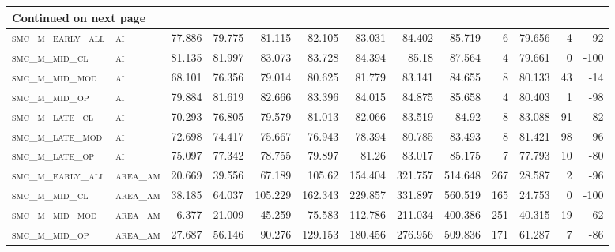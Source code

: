 \begin{landscape}
\begin{center}
\begin{footnotesize}
\begin{longtable}{llrrrrrrrr|rrr}
\hline \multicolumn{13}{|l|}{{Continued on next page}} \\ \hline
\endfoot

\hline \hline
\endlastfoot

\textsc{smc\_m\_early\_all} & \textsc{ai        }   & 77.886   & 79.775   & 81.115   & 82.105   & 83.031   & 84.402   & 85.719   & 6      & 79.656        & 4             & -92             \\
\textsc{smc\_m\_mid\_cl   } & \textsc{ai        }   & 81.135   & 81.997   & 83.073   & 83.728   & 84.394   & 85.18    & 87.564   & 4      & 79.661        & 0             & -100            \\
\textsc{smc\_m\_mid\_mod  } & \textsc{ai        }   & 68.101   & 76.356   & 79.014   & 80.625   & 81.779   & 83.141   & 84.655   & 8      & 80.133        & 43            & -14             \\
\textsc{smc\_m\_mid\_op   } & \textsc{ai        }   & 79.884   & 81.619   & 82.666   & 83.396   & 84.015   & 84.875   & 85.658   & 4      & 80.403        & 1             & -98             \\
\textsc{smc\_m\_late\_cl  } & \textsc{ai        }   & 70.293   & 76.805   & 79.579   & 81.013   & 82.066   & 83.519   & 84.92    & 8      & 83.088        & 91            & 82              \\
\textsc{smc\_m\_late\_mod } & \textsc{ai        }   & 72.698   & 74.417   & 75.667   & 76.943   & 78.394   & 80.785   & 83.493   & 8      & 81.421        & 98            & 96              \\
\textsc{smc\_m\_late\_op  } & \textsc{ai        }   & 75.097   & 77.342   & 78.755   & 79.897   & 81.26    & 83.017   & 85.175   & 7      & 77.793        & 10            & -80             \\
\textsc{smc\_m\_early\_all} & \textsc{area\_am  }   & 20.669   & 39.556   & 67.189   & 105.62   & 154.404  & 321.757  & 514.648  & 267    & 28.587        & 2             & -96             \\
\textsc{smc\_m\_mid\_cl   } & \textsc{area\_am  }   & 38.185   & 64.037   & 105.229  & 162.343  & 229.857  & 331.897  & 560.519  & 165    & 24.753        & 0             & -100            \\
\textsc{smc\_m\_mid\_mod  } & \textsc{area\_am  }   & 6.377    & 21.009   & 45.259   & 75.583   & 112.786  & 211.034  & 400.386  & 251    & 40.315        & 19            & -62             \\
\textsc{smc\_m\_mid\_op   } & \textsc{area\_am  }   & 27.687   & 56.146   & 90.276   & 129.153  & 180.456  & 276.956  & 509.836  & 171    & 61.287        & 7             & -86             \\

\end{longtable}
\end{footnotesize}
\end{center}
\end{landscape}
